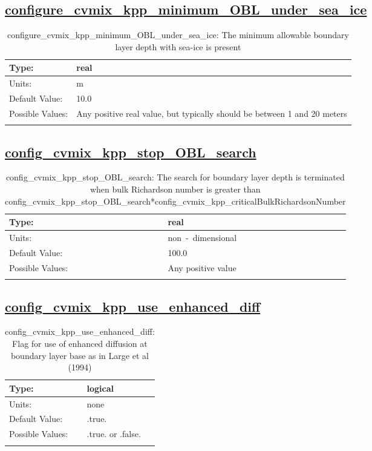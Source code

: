 \subsection[configure\_cvmix\_kpp\_minimum\_OBL\_under\_sea\_ice]{\hyperref[sec:nm_tab_cvmix]{configure\_cvmix\_kpp\_minimum\_OBL\_under\_sea\_ice}}
\label{subsec:nm_sec_configure_cvmix_kpp_minimum_OBL_under_sea_ice}
\begin{center}
\begin{longtable}{| p{2.0in} || p{4.0in} |}
    \hline
    Type: & real \\
    \hline
    Units: & \si{m} \\
    \hline
    Default Value: & 10.0 \\
    \hline
    Possible Values: & Any positive real value, but typically should be between 1 and 20 meters \\
    \hline
    \caption{configure\_cvmix\_kpp\_minimum\_OBL\_under\_sea\_ice: The minimum allowable boundary layer depth with sea-ice is present}
\end{longtable}
\end{center}
\subsection[config\_cvmix\_kpp\_stop\_OBL\_search]{\hyperref[sec:nm_tab_cvmix]{config\_cvmix\_kpp\_stop\_OBL\_search}}
\label{subsec:nm_sec_config_cvmix_kpp_stop_OBL_search}
\begin{center}
\begin{longtable}{| p{2.0in} || p{4.0in} |}
    \hline
    Type: & real \\
    \hline
    Units: & \si{non-dimensional} \\
    \hline
    Default Value: & 100.0 \\
    \hline
    Possible Values: & Any positive value \\
    \hline
    \caption{config\_cvmix\_kpp\_stop\_OBL\_search: The search for boundary layer depth is terminated when bulk Richardson number is greater than config\_cvmix\_kpp\_stop\_OBL\_search*config\_cvmix\_kpp\_criticalBulkRichardsonNumber}
\end{longtable}
\end{center}
\subsection[config\_cvmix\_kpp\_use\_enhanced\_diff]{\hyperref[sec:nm_tab_cvmix]{config\_cvmix\_kpp\_use\_enhanced\_diff}}
\label{subsec:nm_sec_config_cvmix_kpp_use_enhanced_diff}
\begin{center}
\begin{longtable}{| p{2.0in} || p{4.0in} |}
    \hline
    Type: & logical \\
    \hline
    Units: & \si{none} \\
    \hline
    Default Value: & .true. \\
    \hline
    Possible Values: & .true. or .false. \\
    \hline
    \caption{config\_cvmix\_kpp\_use\_enhanced\_diff: Flag for use of enhanced diffusion at boundary layer base as in Large et al (1994)}
\end{longtable}
\end{center}
